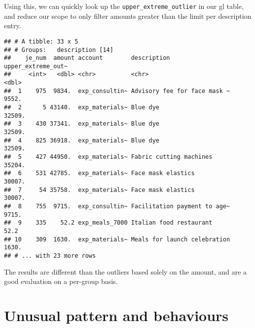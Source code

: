 \documentclass[
]{book}
\newenvironment{Shaded}{\begin{snugshade}}{\end{snugshade}}
\newcommand{\DataTypeTok}[1]{\textcolor[rgb]{0.13,0.29,0.53}{#1}}
\newcommand{\DecValTok}[1]{\textcolor[rgb]{0.00,0.00,0.81}{#1}}
\newcommand{\KeywordTok}[1]{\textcolor[rgb]{0.13,0.29,0.53}{\textbf{#1}}}
\newcommand{\NormalTok}[1]{#1}
\newcommand{\OperatorTok}[1]{\textcolor[rgb]{0.81,0.36,0.00}{\textbf{#1}}}
\newcommand{\StringTok}[1]{\textcolor[rgb]{0.31,0.60,0.02}{#1}}
\begin{document}
Using this, we can quickly look up the \texttt{upper\_extreme\_outlier} in our gl table, and reduce our scope to only filter amounts greater than the limit per description entry.

\begin{Shaded}
\end{Shaded}

\begin{verbatim}
## # A tibble: 33 x 5
## # Groups:   description [14]
##    je_num  amount account        description                  upper_extreme_out~
##     <int>   <dbl> <chr>          <chr>                                     <dbl>
##  1    975  9834.  exp_consultin~ Advisory fee for face mask ~             9552. 
##  2      5 43140.  exp_materials~ Blue dye                                32509. 
##  3    430 37341.  exp_materials~ Blue dye                                32509. 
##  4    825 36918.  exp_materials~ Blue dye                                32509. 
##  5    427 44950.  exp_materials~ Fabric cutting machines                 35204. 
##  6    531 42785.  exp_materials~ Face mask elastics                      30007. 
##  7     54 35758.  exp_materials~ Face mask elastics                      30007. 
##  8    755  9715.  exp_consultin~ Facilitation payment to age~             9715. 
##  9    335    52.2 exp_meals_7000 Italian food restaurant                    52.2
## 10    309  1630.  exp_materials~ Meals for launch celebration             1630. 
## # ... with 23 more rows
\end{verbatim}

The results are different than the outliers based solely on the amount, and are a good evaluation on a per-group basis.

\hypertarget{unusual-pattern-and-behaviours}{%
\section{Unusual pattern and behaviours}\label{unusual-pattern-and-behaviours}}
\end{document}
